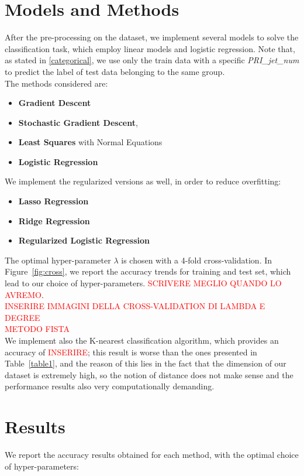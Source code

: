 \documentclass[10pt,conference,compsocconf]{IEEEtran}
\begin{document}
\section{Models and Methods}
\label{models}
After the pre-processing on the dataset, we implement several models to solve the classification task, which employ linear models and logistic regression.
Note that, as stated in \ref{categorical}, we use only the train data with a specific \emph{PRI\_jet\_num} to predict the label of test data belonging to the same group. \\
The methods considered are:
\begin{itemize}
    \item \textbf{Gradient Descent}
    \item \textbf{Stochastic Gradient Descent}, 
    \item \textbf{Least Squares} with Normal Equations
    \item \textbf{Logistic Regression}
    \end{itemize}
We implement the regularized versions as well, in order to reduce overfitting:
\begin{itemize}
\item \textbf{Lasso Regression}
\item \textbf{Ridge Regression}
\item \textbf{Regularized Logistic Regression}
\end{itemize}

The optimal hyper-parameter $\lambda$ is chosen with a 4-fold cross-validation. In Figure~\ref{fig:cross}, we report the accuracy trends for training and test set, which lead to our choice of hyper-parameters. \textcolor{red}{SCRIVERE MEGLIO QUANDO LO AVREMO}.
\\
\newline
\textcolor{red}{INSERIRE IMMAGINI DELLA CROSS-VALIDATION DI LAMBDA E DEGREE}
\\
\textcolor{red}{METODO FISTA}
\\
We implement also the K-nearest classification algorithm, which provides an accuracy of \textcolor{red}{INSERIRE}; this result is worse than the ones presented in Table~\ref{table1}, and the reason of this lies in the fact that the dimension of our dataset is extremely high, so the notion of distance does not make sense and the performance results also very computationally demanding.
\section{Results}
\label{results}
We report the accuracy results obtained for each method, with the optimal choice of hyper-parameters: \\
\end{document}
